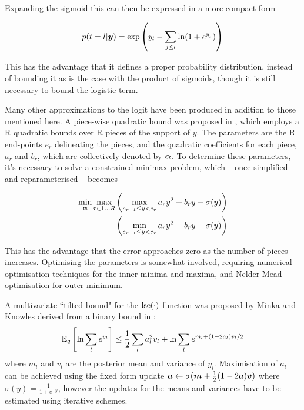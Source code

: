 Expanding the sigmoid this can then be expressed in a more compact form

\begin{equation}
p(t = l | \vv{y}) = \exp \left( y_l - \sum_{j \leq l} \ln (1 + e^{y_j}) \right)
\end{equation}

This has the advantage that it defines a proper probability distribution, instead of bounding it as is the case with the product of sigmoids, though it is still necessary to bound the logistic term.

Many other approximations to the logit have been produced in addition to those mentioned here. A piece-wise quadratic bound was proposed in \cite{Marlin2011}, which employs a R quadratic bounds over R pieces of the support of $y$. The parameters are the R end-points $e_r$ delineating the pieces, and the quadratic coefficients for each piece, $a_r$ and $b_r$, which are collectively denoted by $\vv{\alpha}$. To determine these parameters, it's necessary to solve a constrained minimax problem, which -- once simplified and reparameterised -- becomes 

\begin{align}
\begin{split}
\min_{\vv{\alpha}} \max_{r \in {1 \ldots R}}
 & \left(  \max_{e_{r-1} \leq y < e_r} a_r y^2 + b_r y - \sigma(y) \right) \\
 & \left(  \min_{e_{r-1} \leq y < e_r} a_r y^2 + b_r y - \sigma(y)  \right)
\end{split}
\end{align}

This has the advantage that the error approaches zero as the number of pieces increases. Optimising the parameters is somewhat involved, requiring numerical optimisation techniques for the inner minima and maxima, and Nelder-Mead optimisation for outer minimum.

A multivariate ``tilted bound" for the $\lse(\cdot)$ function was proposed by Minka and Knowles\cite{MinkaKnowles} derived from a binary bound in \cite{SaulJordan1998}:
\begin{equation}
\ex{\ln \sum_l e^{y_l}}{q} \leq \half \sum_l a_l^2 v_l + \ln \sum_l e^{m_l + (1-2a_l)v_l/2}
\end{equation}
where $m_l$ and $v_l$ are the posterior mean and variance of $y_l$. Maximisation of $a_l$ can be achieved using the fixed form update $\vv{a} \leftarrow \sigma(\vv{m} + \half(1 - 2 \vv{a})\vv{v})$ where $\sigma(y) = \frac{1}{1 + e^{-y}}$, however the updates for the means and variances have to be estimated using iterative schemes. 

